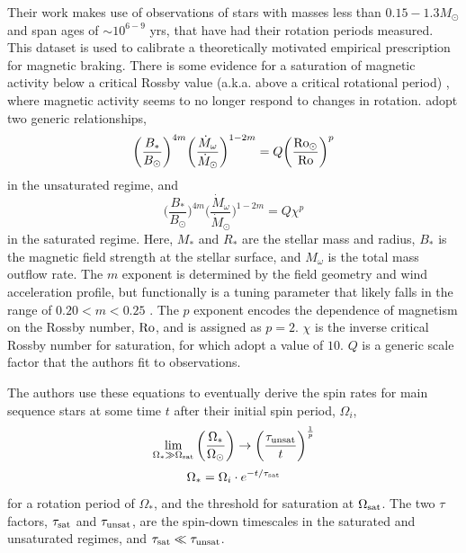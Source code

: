 Their work makes use of observations of stars with masses less than $0.15 - 1.3 M_\odot$ and span ages of $\sim 10^{6-9}$ yrs, that have had their rotation periods measured. This dataset is used to calibrate a theoretically motivated empirical prescription for magnetic braking. There is some evidence for a saturation of magnetic activity below a critical Rossby value (a.k.a. above a critical rotational period) \citep{reiners2009}, where magnetic activity seems to no longer respond to changes in rotation. \citet{matt2015} adopt two generic relationships, 
\begin{equation}
    \bigg(\frac{B_*}{B_\odot}\bigg)^{4m} \bigg(\frac{\dot M_\omega}{\dot M_\odot}\bigg)^{1-2m} = Q \bigg(\frac{\rm Ro_\odot}{\rm Ro} \bigg)^{p}
\end{equation}
in the unsaturated regime, and 
\begin{equation}
    \bigg(\frac{B_*}{B_\odot}\bigg)^{4m} \bigg(\frac{\dot M_\omega}{\dot M_\odot}\bigg)^{1-2m} = Q \chi^{p}
\end{equation}
in the saturated regime. Here, $M_*$ and $R_*$ are the stellar mass and radius, $B_*$ is the magnetic field strength at the stellar surface, and $M_\omega$ is the total mass outflow rate. The $m$ exponent is determined by the field geometry and wind acceleration profile, but functionally is a tuning parameter that likely falls in the range of $0.20 < m < 0.25$ \citep{matt2015}. The $p$ exponent encodes the dependence of magnetism on the Rossby number, $\rm Ro$, and is assigned as $p = 2$. $\chi$ is the inverse critical Rossby number for saturation, for which \citet{matt2015} adopt a value of $10$. $Q$ is a generic scale factor that the authors fit to observations.

The authors use these equations to eventually derive the spin rates for main sequence stars at some time $t$ after their initial spin period, $\Omega_i$, 
\begin{equation}
    \lim_{\Omega_* \gg \Omega_{\rm sat}} \bigg(\frac{\Omega_*}{\Omega_\odot}\bigg) \rightarrow \bigg(\frac{\tau_{\rm unsat}}{t}\bigg)^{\frac{1}{p}}
\end{equation}
\begin{equation}
    \Omega_* = \Omega_i \cdot e^{-t/\tau_{\rm sat}}
\end{equation}
for a rotation period of $\Omega_*$, and the threshold for saturation at $\Omega_{\rm sat}$. The two $\tau$ factors, $\tau_{\rm sat}$ and $\tau_{\rm unsat}$, are the spin-down timescales in the saturated and unsaturated regimes, and $\tau_{\rm sat} \ll \tau_{\rm unsat}$.

